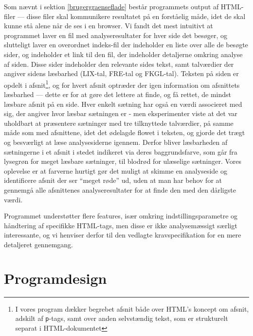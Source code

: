 \documentclass[a4paper,oneside,article]{memoir}
\begin{document}
Som nævnt i sektion \ref{brugergraenseflade} består programmets output
af HTML-filer --- disse filer skal kommunikere resultatet på en
forståelig måde, idet de skal kunne stå alene når de ses i en
browser. Vi fandt det mest intuitivt at programmet laver en fil med
analyseresultater for hver side det besøger, og slutteligt laver en
overordnet indeks-fil der indeholder en liste over alle de besøgte
sider, og indeholder et link til den fil, der indeholder detaljerne
omkring analyse af siden. Disse sider indeholder den relevante sides
tekst, samt talværdier der angiver sidens læsbarhed (LIX-tal, FRE-tal
og FKGL-tal). Teksten på siden er opdelt i afsnit\footnote{I vores
  program dækker begrebet afsnit både over HTML's koncept om afsnit,
  adskilt af \texttt{p}-tags, samt over anden selvstændig tekst, som
  er strukturelt separat i HTML-dokumentet}, og for hvert afsnit
optræder der igen information om afsnittets læsbarhed --- dette er for
at gøre det lettere at finde, og få rettet, de mindst læsbare afsnit
på en side. Hver enkelt sætning har også en værdi associeret med sig,
der angiver hvor læsbar sætningen er - men eksperimenter viste at det
var uholdbart at præsentere sætninger med tre tilknyttede talværdier,
på samme måde som med afsnittene, idet det ødelagde flowet i teksten,
og gjorde det trægt og besværligt at læse analysesiderne
igennem. Derfor bliver læsbarheden af sætningerne i et afsnit i stedet
indikeret via deres baggrundsfarve, som går fra lysegrøn for meget
læsbare sætninger, til blodrød for ulæselige sætninger. Vores
oplevelse er at farverne hurtigt gør det muligt at skimme en
analyseside og identificere afsnit der ser ``meget røde'' ud, uden at
man har behov for at gennemgå alle afsnittenes analyseresultater for
at finde den med den dårligste værdi.

Programmet understøtter flere features, især omkring
indstillingsparametre og håndtering af specifikke HTML-tags, men disse
er ikke analysemæssigt særligt interessante, og vi henviser derfor til
den vedlagte kravspecifikation for en mere detaljeret gennemgang.

\chapter{Programdesign}
\end{document}

